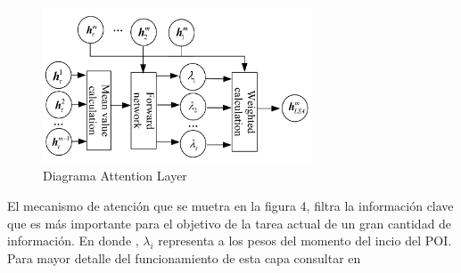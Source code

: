 \documentclass[sigplan,screen]{acmart}
\begin{document}
\begin{figure}[H]
\includegraphics[width=8cm]{attention.png}
\centering
\caption{Diagrama Attention Layer}
\end{figure}
El mecanismo de atención que se muetra en la figura 4, filtra la información clave que es más importante para el objetivo de la tarea actual de un gran cantidad de información. En donde , $\lambda_i$ representa a los pesos del momento del incio del POI.
Para mayor detalle del funcionamiento de esta capa consultar en \cite{wang2021poi}
\end{document}
